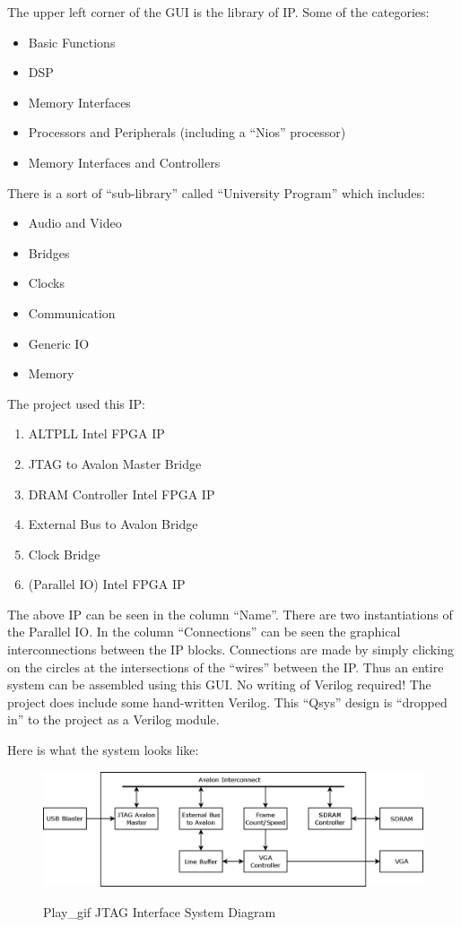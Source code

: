 The upper left corner of the GUI is the library of IP.  Some of the categories:

\begin{itemize}
	\item Basic Functions
\item DSP
\item Memory Interfaces
\item Processors and Peripherals (including a ``Nios'' processor)
\item Memory Interfaces and Controllers
\end{itemize}

There is a sort of ``sub-library'' called  ``University Program'' which includes:

\begin{itemize}
	\item Audio and Video
\item Bridges
\item Clocks
\item Communication
\item Generic IO
\item Memory
\end{itemize}

The project used this IP:

\begin{enumerate}
\item ALTPLL Intel FPGA IP
\item JTAG to Avalon Master Bridge
\item DRAM Controller Intel FPGA IP
\item External Bus to Avalon Bridge
\item Clock Bridge
\item (Parallel IO) Intel FPGA IP
\end{enumerate}

The above IP can be seen in the column ``Name''.  There are two instantiations of the Parallel IO.
In the column ``Connections'' can be seen the graphical interconnections between the IP blocks.
Connections are made by simply clicking on the circles at the intersections of the ``wires'' between the IP.
Thus an entire system can be assembled using this GUI.  No writing of Verilog required!
The project does include some hand-written Verilog.  This ``Qsys'' design is ``dropped in'' to the project
as a Verilog module.

Here is what the system looks like:

\begin{figure}[h]
	\centering
	\includegraphics[width=1.0\textwidth]{images/play_gif.png}
	\centering\bfseries
	\caption{Play\_gif JTAG Interface System Diagram}
\end{figure}


